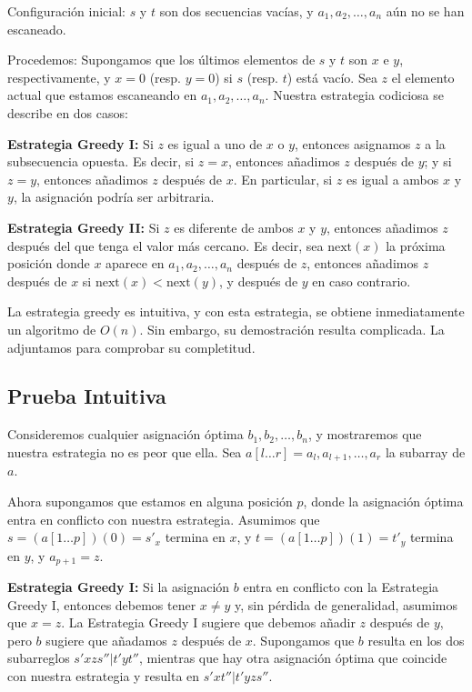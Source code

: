 \documentclass{article}
\begin{document}
Configuración inicial: $s$ y $t$ son dos secuencias vacías, y $a_1, a_2, \ldots, a_n$ aún no se han escaneado.

Procedemos: Supongamos que los últimos elementos de $s$ y $t$ son $x$ e $y$, respectivamente, y $x=0$ (resp. $y=0$) si $s$ (resp. $t$) está vacío. Sea $z$ el elemento actual que estamos escaneando en $a_1, a_2, \ldots, a_n$. Nuestra estrategia codiciosa se describe en dos casos:

\textbf{Estrategia Greedy I:} Si $z$ es igual a uno de $x$ o $y$, entonces asignamos $z$ a la subsecuencia opuesta. Es decir, si $z=x$, entonces añadimos $z$ después de $y$; y si $z=y$, entonces añadimos $z$ después de $x$. En particular, si $z$ es igual a ambos $x$ y $y$, la asignación podría ser arbitraria.

\textbf{Estrategia Greedy II:} Si $z$ es diferente de ambos $x$ y $y$, entonces añadimos $z$ después del que tenga el valor más cercano. Es decir, sea $\text{next}(x)$ la próxima posición donde $x$ aparece en $a_1, a_2, \ldots, a_n$ después de $z$, entonces añadimos $z$ después de $x$ si $\text{next}(x) < \text{next}(y)$, y después de $y$ en caso contrario.

La estrategia greedy es intuitiva, y con esta estrategia, se obtiene inmediatamente un algoritmo de $O(n)$. Sin embargo, su demostración resulta complicada. La adjuntamos para comprobar su completitud.



\subsection{Prueba Intuitiva}

Consideremos cualquier asignación óptima $b_1, b_2, \ldots, b_n$, y mostraremos que nuestra estrategia no es peor que ella. Sea $a[l \ldots r] = a_l, a_{l+1}, \ldots, a_r$ la subarray de $a$.

Ahora supongamos que estamos en alguna posición $p$, donde la asignación óptima entra en conflicto con nuestra estrategia. Asumimos que $s = (a[1 \ldots p])(0) = s'_{x}$ termina en $x$, y $t = (a[1 \ldots p])(1) = t'_{y}$ termina en $y$, y $a_{p+1} = z$.

\textbf{Estrategia Greedy I:} Si la asignación $b$ entra en conflicto con la Estrategia Greedy I, entonces debemos tener $x \neq y$ y, sin pérdida de generalidad, asumimos que $x = z$. La Estrategia Greedy I sugiere que debemos añadir $z$ después de $y$, pero $b$ sugiere que añadamos $z$ después de $x$. Supongamos que $b$ resulta en los dos subarreglos $s'xzs''  | t'yt''$, mientras que hay otra asignación óptima que coincide con nuestra estrategia y resulta en $s'xt''| t'yzs''$.
\end{document}
